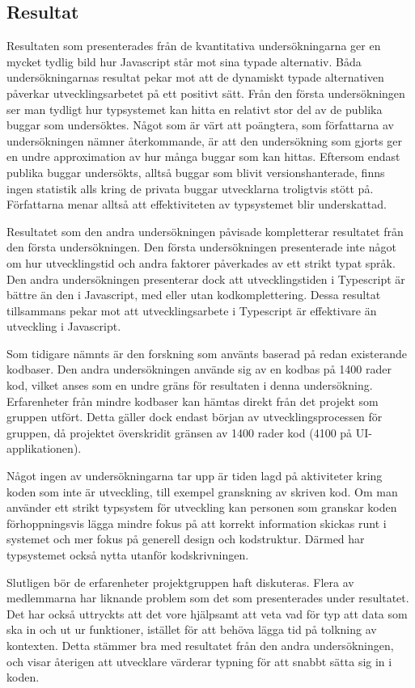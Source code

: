\subsection{Resultat}
\label{subsec:alexander-discussion-results}

Resultaten som presenterades från de kvantitativa undersökningarna ger en mycket tydlig bild hur Javascript står mot sina typade alternativ. Båda undersökningarnas resultat pekar mot att de dynamiskt typade alternativen påverkar utvecklingsarbetet på ett positivt sätt. Från den första undersökningen ser man tydligt hur typsystemet kan hitta en relativt stor del av de publika buggar som undersöktes. Något som är värt att poängtera, som författarna av undersökningen nämner återkommande, är att den undersökning som gjorts ger en undre approximation av hur många buggar som kan hittas. Eftersom endast publika buggar undersökts, alltså buggar som blivit versionshanterade, finns ingen statistik alls kring de privata buggar utvecklarna troligtvis stött på. Författarna menar alltså att effektiviteten av typsystemet blir underskattad.

Resultatet som den andra undersökningen påvisade kompletterar resultatet från den första undersökningen.  Den första undersökningen presenterade inte något om hur utvecklingstid och andra faktorer påverkades av ett strikt typat språk. Den andra undersökningen presenterar dock att utvecklingstiden i Typescript är bättre än den i Javascript, med eller utan kodkomplettering. Dessa resultat tillsammans pekar mot att utvecklingsarbete i Typescript är effektivare än utveckling i Javascript. 

Som tidigare nämnts är den forskning som använts baserad på redan existerande kodbaser. Den andra undersökningen använde sig av en kodbas på 1400 rader kod, vilket anses som en undre gräns för resultaten i denna undersökning. Erfarenheter från mindre kodbaser kan hämtas direkt från det projekt som gruppen utfört. Detta gäller dock endast början av utvecklingsprocessen för gruppen, då projektet överskridit gränsen av 1400 rader kod (4100 på UI-applikationen\cite{current-ui-commit}).

Något ingen av undersökningarna tar upp är tiden lagd på aktiviteter kring koden som inte är utveckling, till exempel granskning av skriven kod. Om man använder ett strikt typsystem för utveckling kan personen som granskar koden förhoppningsvis lägga mindre fokus på att korrekt information skickas runt i systemet och mer fokus på generell design och kodstruktur. Därmed har typsystemet också nytta utanför kodskrivningen.

Slutligen bör de erfarenheter projektgruppen haft diskuteras. Flera av medlemmarna har liknande problem som det som presenterades under resultatet. Det har också uttryckts att det vore hjälpsamt att veta vad för typ att data som ska in och ut ur funktioner, istället för att behöva lägga tid på tolkning av kontexten. Detta stämmer bra med resultatet från den andra undersökningen, och visar återigen att utvecklare värderar typning för att snabbt sätta sig in i koden. 

\pagebreak